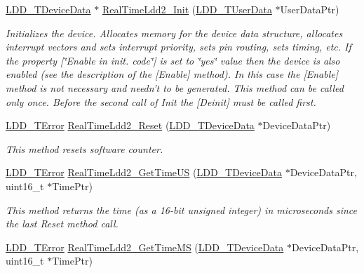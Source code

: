 \begin{DoxyCompactItemize}
\item 
\hyperlink{group___p_e___types__module_gac5cf1362f1f0e3a2ce71b1bf2276d091}{L\-D\-D\-\_\-\-T\-Device\-Data} $\ast$ \hyperlink{group___real_time_ldd2__module_ga0b24feecda4b259a58053e9a4672d2cd}{Real\-Time\-Ldd2\-\_\-\-Init} (\hyperlink{group___p_e___types__module_ga0b66a73f87238a782318aa0be7578e35}{L\-D\-D\-\_\-\-T\-User\-Data} $\ast$User\-Data\-Ptr)
\begin{DoxyCompactList}\small\item\em Initializes the device. Allocates memory for the device data structure, allocates interrupt vectors and sets interrupt priority, sets pin routing, sets timing, etc. If the property \mbox{[}\char`\"{}\-Enable in init. code\char`\"{}\mbox{]} is set to \char`\"{}yes\char`\"{} value then the device is also enabled (see the description of the \mbox{[}Enable\mbox{]} method). In this case the \mbox{[}Enable\mbox{]} method is not necessary and needn't to be generated. This method can be called only once. Before the second call of Init the \mbox{[}Deinit\mbox{]} must be called first. \end{DoxyCompactList}\item 
\hyperlink{group___p_e___types__module_ga24c2b045fd04e79e85f261ce4df35588}{L\-D\-D\-\_\-\-T\-Error} \hyperlink{group___real_time_ldd2__module_gae3be94a12612ec0614698cc7a3c5855a}{Real\-Time\-Ldd2\-\_\-\-Reset} (\hyperlink{group___p_e___types__module_gac5cf1362f1f0e3a2ce71b1bf2276d091}{L\-D\-D\-\_\-\-T\-Device\-Data} $\ast$Device\-Data\-Ptr)
\begin{DoxyCompactList}\small\item\em This method resets software counter. \end{DoxyCompactList}\item 
\hyperlink{group___p_e___types__module_ga24c2b045fd04e79e85f261ce4df35588}{L\-D\-D\-\_\-\-T\-Error} \hyperlink{group___real_time_ldd2__module_ga256d6a82db79299e421b0bac967ab2fb}{Real\-Time\-Ldd2\-\_\-\-Get\-Time\-U\-S} (\hyperlink{group___p_e___types__module_gac5cf1362f1f0e3a2ce71b1bf2276d091}{L\-D\-D\-\_\-\-T\-Device\-Data} $\ast$Device\-Data\-Ptr, uint16\-\_\-t $\ast$Time\-Ptr)
\begin{DoxyCompactList}\small\item\em This method returns the time (as a 16-\/bit unsigned integer) in microseconds since the last Reset method call. \end{DoxyCompactList}\item 
\hyperlink{group___p_e___types__module_ga24c2b045fd04e79e85f261ce4df35588}{L\-D\-D\-\_\-\-T\-Error} \hyperlink{group___real_time_ldd2__module_ga0ef362beecb2f27b82b32b4b8a28bfcd}{Real\-Time\-Ldd2\-\_\-\-Get\-Time\-M\-S} (\hyperlink{group___p_e___types__module_gac5cf1362f1f0e3a2ce71b1bf2276d091}{L\-D\-D\-\_\-\-T\-Device\-Data} $\ast$Device\-Data\-Ptr, uint16\-\_\-t $\ast$Time\-Ptr)

\end{DoxyCompactItemize}
